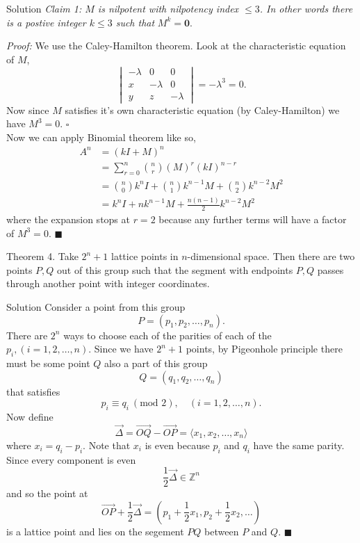 \documentclass{article}
\begin{document}
\begin{solution}{Solution}
\textit{Claim 1: $M$ is nilpotent with nilpotency index $\leq 3$. In other
words there is a postive integer $k \leq 3$ such that } $M^k = \mathbf{0}$.
\vspace{0.2cm}

\textit{Proof:} We use the Caley-Hamilton theorem. Look at the
characteristic equation of $M$,
$$
\begin{vmatrix}
-\lambda & 0 & 0 \\
x & -\lambda & 0 \\
y & z & -\lambda
\end{vmatrix}
= - \lambda^3 = 0.
$$
Now since $M$ satisfies it's own characteristic equation (by Caley-Hamilton)
we have $M^3 = 0$. $\square$ \\

Now we can apply Binomial theorem like so,
\[
\begin{aligned}
A^n &= (kI + M)^n \\
&= \sum_{r=0}^n \binom{n}{r} (M)^r (kI)^{n-r} \\
&= \binom{n}{0} k^n I + \binom{n}{1} k^{n-1} M + \binom{n}{2} k^{n-2} M^2 \\
&= k^n I + n k^{n-1} M + \frac{n(n-1)}{2} k^{n-2} M^2
\end{aligned}
\]
where the expansion stops at $r = 2$ because any further terms will have
a factor of $M^3 = 0$. $\blacksquare$
\end{solution}
\newpage

\begin{problem}{Theorem 4.}
Take $2^n + 1$ lattice points in $n$-dimensional space. Then there are two
points $P, Q$ out of this group such that the segment with endpoints
$P, Q$ passes through another point with integer coordinates.
\end{problem}

\begin{solution}{Solution}
Consider a point from this group
$$
P = (p_1, p_2, \ldots, p_n).
$$
There are $2^n$ ways to choose each of the parities of each of the
$p_i, (i=1,2,\ldots, n)$. Since we have $2^n + 1$ points, by Pigeonhole
principle there must be some point $Q$ also a part of this group
$$
Q = (q_1, q_2, \ldots, q_n)
$$
that satisfies
$$
p_i \equiv q_i \ (\text{mod } 2), \quad (i = 1,2,\ldots, n).
$$
Now define
$$
\overrightarrow{\Delta} = \overrightarrow{OQ} - \overrightarrow{OP}
= \langle x_1, x_2, \ldots, x_n \rangle
$$
where $x_i = q_i - p_i$. Note that $x_i$ is even because $p_i$ and $q_i$
have the same parity. Since every component is even
$$
\frac12 \overrightarrow{\Delta} \in \mathbb{Z}^n
$$
and so the point at
$$
\overrightarrow{OP} + \frac12 \overrightarrow{\Delta}
= \left(p_1 + \frac12 x_1, p_2 + \frac12 x_2, \ldots \right)
$$
is a lattice point and lies on the segement $PQ$ between $P$ and $Q$.
$\blacksquare$
\end{solution}
\newpage
\end{document}
